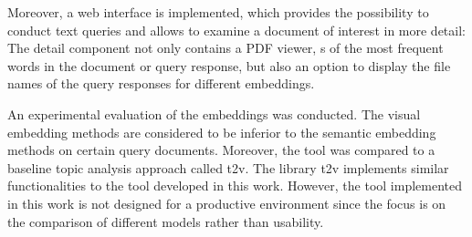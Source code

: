 Moreover, a web interface is implemented, which provides the possibility to conduct text queries and
allows to examine a document of interest in more detail:
The detail component not only contains a PDF viewer, 
\wordcloud{}s of the most frequent words in the document or query response, but also an option to display the file names of the query responses for different embeddings.

An experimental evaluation of the embeddings was conducted.
The visual embedding methods are considered to be inferior to the semantic embedding methods on certain query documents.
Moreover, the tool was compared to a baseline topic analysis approach called \ac{t2v}.
The library \ac{t2v} implements similar functionalities to the tool developed in this work.
However, the tool implemented in this work is not designed for a productive environment since 
the focus is on the comparison of different models rather than usability.